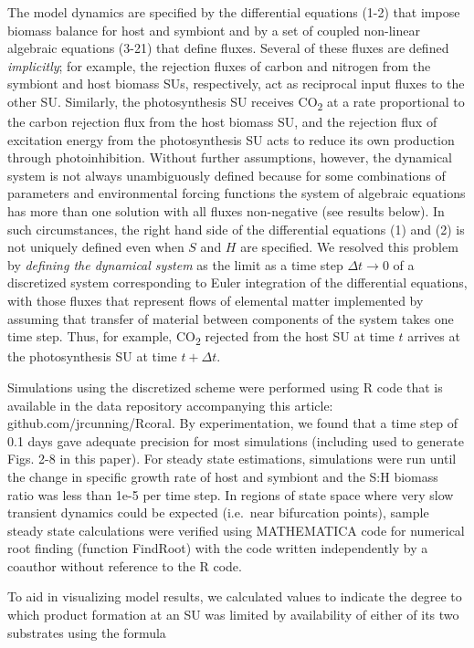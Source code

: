 \documentclass[]{elsarticle} %
\begin{document}
The model dynamics are specified by the differential equations (1-2)
that impose biomass balance for host and symbiont and by a set of
coupled non-linear algebraic equations (3-21) that define fluxes.
Several of these fluxes are defined \emph{implicitly}; for example, the
rejection fluxes of carbon and nitrogen from the symbiont and host
biomass SUs, respectively, act as reciprocal input fluxes to the other
SU. Similarly, the photosynthesis SU receives CO\textsubscript{2} at a
rate proportional to the carbon rejection flux from the host biomass SU,
and the rejection flux of excitation energy from the photosynthesis SU
acts to reduce its own production through photoinhibition. Without
further assumptions, however, the dynamical system is not always
unambiguously defined because for some combinations of parameters and
environmental forcing functions the system of algebraic equations has
more than one solution with all fluxes non-negative (see results below).
In such circumstances, the right hand side of the differential equations
(1) and (2) is not uniquely defined even when \(S\) and \(H\) are
specified. We resolved this problem by \emph{defining the dynamical
system} as the limit as a time step \(\Delta t \rightarrow 0\) of a
discretized system corresponding to Euler integration of the
differential equations, with those fluxes that represent flows of
elemental matter implemented by assuming that transfer of material
between components of the system takes one time step. Thus, for example,
CO\textsubscript{2} rejected from the host SU at time \(t\) arrives at
the photosynthesis SU at time \(t + \Delta t\).

Simulations using the discretized scheme were performed using R code
that is available in the data repository accompanying this article:
github.com/jrcunning/Rcoral. By experimentation, we found that a time
step of 0.1 days gave adequate precision for most simulations (including
used to generate Figs. 2-8 in this paper). For steady state estimations,
simulations were run until the change in specific growth rate of host
and symbiont and the S:H biomass ratio was less than 1e-5 per time step.
In regions of state space where very slow transient dynamics could be
expected (i.e.~near bifurcation points), sample steady state
calculations were verified using MATHEMATICA code for numerical root
finding (function FindRoot) with the code written independently by a
coauthor without reference to the R code.

To aid in visualizing model results, we calculated values to indicate
the degree to which product formation at an SU was limited by
availability of either of its two substrates using the formula
\end{document}
